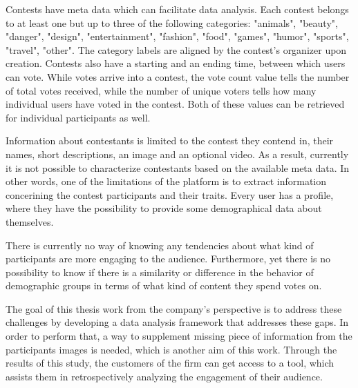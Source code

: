     Contests have meta data which can facilitate data analysis. Each contest belongs to at least one but up to three of the following categories: "animals", "beauty", "danger", "design", "entertainment", "fashion", "food", "games", "humor", "sports", "travel", "other". The category labels are aligned by the contest's organizer upon creation. Contests also have a starting and an ending time, between which users can vote. While votes arrive into a contest, the vote count value tells the number of total votes received, while the number of unique voters tells how many individual users have voted in the contest. Both of these values can be retrieved for individual participants as well. 

    Information about contestants is limited to the contest they contend in, their names, short descriptions, an image and an optional video. As a result, currently it is not possible to characterize contestants based on the available meta data. In other words, one of the limitations of the platform is to extract information concerining the contest participants and their traits. Every user has a profile, where they have the possibility to provide some demographical data about themselves.
    
    There is currently no way of knowing any tendencies about what kind of participants are more engaging to the audience. Furthermore, yet there is no possibility to know if there is a similarity or difference in the behavior of demographic groups in terms of what kind of content they spend votes on. 
    
    The goal of this thesis work from the company's perspective is to address these challenges by developing a data analysis framework that addresses these gaps. In order to perform that, a way to supplement missing piece of information from the participants images is needed, which is another aim of this work. Through the results of this study, the customers of the firm can get access to a tool, which assists them in retrospectively analyzing the engagement of their audience.

